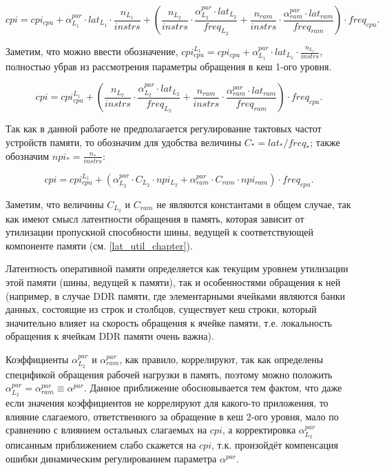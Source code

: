     \begin{equation}
        cpi = cpi_{cpu} + \alpha_{L_1}^{par} \cdot lat_{L_1} \cdot \frac{n_{L_1}}{instrs} +
        \left( \frac{n_{L_2}}{instrs} \cdot \frac{\alpha_{L_2}^{par} \cdot lat_{L_2}}{freq_{L_2}} +
        \frac{n_{ram}}{instrs} \cdot \frac{\alpha_{ram}^{par} \cdot lat_{ram}}{freq_{ram}} \right) \cdot freq_{cpu}.
    \end{equation}

    Заметим, что можно ввести обозначение,
    $cpi_{cpu}^{L_1} = cpi_{cpu} + \alpha_{L_1}^{par} \cdot lat_{L_1} \cdot \frac{n_{L_1}}{instrs}$,
    полностью убрав из рассмотрения параметры обращения в кеш 1-ого уровня.

    \begin{equation}
        cpi = cpi_{cpu}^{L_1} +
        \left( \frac{n_{L_2}}{instrs} \cdot \frac{\alpha_{L_2}^{par} \cdot lat_{L_2}}{freq_{L_2}} +
        \frac{n_{ram}}{instrs} \cdot \frac{\alpha_{ram}^{par} \cdot lat_{ram}}{freq_{ram}} \right) \cdot freq_{cpu}.
    \end{equation}

    Так как в данной работе не предполагается регулирование тактовых частот устройств памяти, то
    обозначим для удобства величины $C_{*} = lat_{*} / freq_{*}$; также обозначим
    $npi_{*} = \frac{n_{*}}{instrs}$:

    \begin{equation}
        cpi = cpi_{cpu}^{L_1} +
        \left( \alpha_{L_2}^{par} \cdot C_{L_2} \cdot npi_{L_2} +
               \alpha_{ram}^{par} \cdot C_{ram} \cdot npi_{ram} \right) \cdot freq_{cpu}.
    \end{equation}

    Заметим, что величины $C_{L_2}$ и $C_{ram}$ не являются константами в общем случае, так как
    имеют смысл латентности обращения в память, которая зависит от утилизации пропускной способности
    шины, ведущей к соответствующей компоненте памяти (см. \ref{lat_util_chapter}).

    Латентность оперативной памяти определяется как текущим уровнем утилизации этой памяти
    (шины, ведущей к памяти), так и особенностями обращения к ней (например, в случае DDR
    памяти, где элементарными ячейками являются банки данных, состоящие из строк и столбцов,
    существует кеш строки, который значительно влияет на скорость обращения
    к ячейке памяти, т.е. локальность обращения к ячейкам DDR памяти очень важна).

    Коэффициенты $\alpha_{L_2}^{par}$ и $\alpha_{ram}^{par}$, как правило, коррелируют, так как
    определены спецификой обращения рабочей нагрузки в память, поэтому можно положить
    $\alpha_{L_2}^{par} = \alpha_{ram}^{par} \equiv \alpha^{par}$. Данное приближение обосновывается тем
    фактом, что даже если значения коэффициентов не коррелируют для какого-то приложения, то
    влияние слагаемого, ответственного за обращение в кеш 2-ого уровня, мало по сравнению с влиянием
    остальных слагаемых на $cpi$, а корректировка $\alpha_{L_2}^{par}$ описанным приближением слабо
    скажется на $cpi$, т.к. произойдёт компенсация ошибки динамическим регулированием параметра $\alpha^{par}$.

